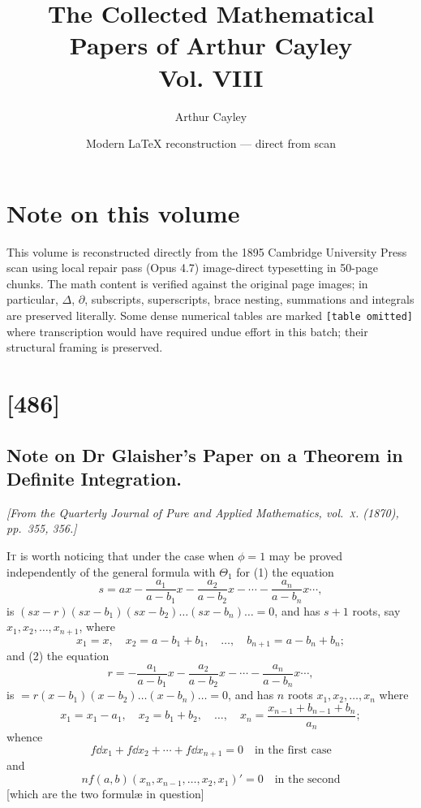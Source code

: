 \documentclass[11pt,a4paper]{book}
\title{The Collected Mathematical Papers of Arthur Cayley\\Vol. VIII}
\author{Arthur Cayley}
\date{Modern \LaTeX{} reconstruction --- direct from scan}
\begin{document}
\maketitle

\frontmatter
\section*{Note on this volume}
\noindent
This volume is reconstructed directly from the 1895 Cambridge University Press
scan using local repair pass (Opus 4.7) image-direct typesetting in 50-page chunks. The
math content is verified against the original page images; in particular,
\(\Delta\), \(\partial\), subscripts, superscripts, brace nesting, summations
and integrals are preserved literally. Some dense numerical tables are marked
\texttt{[table omitted]} where transcription would have required undue effort
in this batch; their structural framing is preserved.

\clearpage


\section{[486]}
\subsection{Note on Dr Glaisher's Paper on a Theorem in Definite Integration.}

\begin{center}
\textit{[From the Quarterly Journal of Pure and Applied Mathematics, vol.~\textsc{x}. (1870), pp.~355, 356.]}
\end{center}

\textsc{It} is worth noticing that under the case when $\phi=1$ may be proved
independently of the general formula with $\Theta_1$ for (1) the equation
\[
s = a x - \frac{a_1}{a - b_1}x - \frac{a_2}{a - b_2}x - \cdots - \frac{a_n}{a - b_n}x \cdots,
\]
is $(s x - r)(s x - b_1)(s x - b_2) \ldots (s x - b_n) \ldots = 0$,
and has $s + 1$ roots, say $x_1, x_2, \ldots, x_{n+1}$, where
\[
x_1 = x, \quad x_2 = a - b_1 + b_1, \quad \ldots, \quad b_{n+1} = a - b_n + b_n;
\]
and (2) the equation
\[
r = -\frac{a_1}{a - b_1}x - \frac{a_2}{a - b_2}x - \cdots - \frac{a_n}{a - b_n}x \cdots,
\]
is $= r(x - b_1)(x - b_2) \ldots (x - b_n) \ldots = 0$,
and has $n$ roots $x_1, x_2, \ldots, x_n$ where
\[
x_1 = x_1 - a_1, \quad x_2 = b_1 + b_2, \quad \ldots, \quad x_n = \frac{x_{n-1} + b_{n-1} + b_n}{a_n};
\]
whence
\[
f \dd x_1 + f \dd x_2 + \cdots + f \dd x_{n+1} = 0 \quad \text{in the first case}
\]
and
\[
n f(a, b)(x_n, x_{n-1}, \ldots, x_2, x_1)' = 0 \quad \text{in the second}
\]
\textnormal{[which are the two formul\ae{} in question]}
\end{document}
